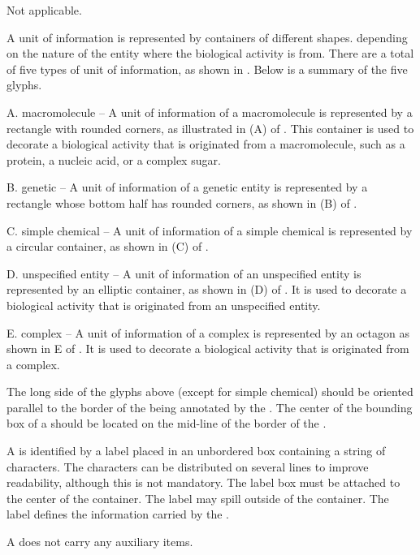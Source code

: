 \begin{glyphDescription}

\glyphSboTerm Not applicable.

\glyphContainer A unit of information is represented by containers of different shapes. depending on the nature of the entity where the biological activity is from.  There are a total of five types of unit of information, as shown in .   Below is a summary of the five glyphs.


A. macromolecule -- A unit of information of a macromolecule is represented by a rectangle with rounded corners, as illustrated in (A) of .  This container is used to decorate a biological activity that is originated from a macromolecule, such as a protein, a nucleic acid, or a complex sugar.

B. genetic -- A unit of information of a genetic entity is represented by a rectangle whose bottom half has rounded corners, as shown in (B) of  .

C. simple chemical -- A unit of information of a simple chemical is represented by a circular container, as shown in (C) of .  

D. unspecified entity -- A unit of information of an unspecified entity is represented by an elliptic container, as shown in (D) of .  It is used to decorate a biological activity that is originated from an unspecified entity.

E. complex -- A unit of information of a complex is represented by an octagon as shown in E of .  It is used to decorate a biological activity that is originated from a complex.

The long side of the glyphs above (except for simple chemical) should be oriented parallel to the border of the  being annotated by the . The center of the bounding box of a  should be located on the mid-line of the border of the .

\glyphLabel A  is identified by a label placed in an unbordered box containing a string of characters.  The characters can be distributed on several lines to improve readability, although this is not mandatory.  The label box must be attached to the center of the container.  The label may spill outside of the container.  The label defines the information carried by the .  


\glyphAux A  does not carry any auxiliary items.



\end{glyphDescription}

